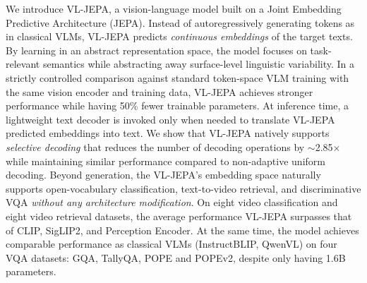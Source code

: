 
We introduce VL-JEPA, a vision-language model built on a Joint Embedding Predictive Architecture (JEPA). Instead of autoregressively generating tokens as in classical VLMs, VL-JEPA predicts \textit{continuous embeddings} of the target texts. By learning in an abstract representation space, the model focuses on task-relevant semantics while abstracting away surface-level linguistic variability. In a strictly controlled comparison against standard token-space VLM training with the same vision encoder and training data, VL-JEPA achieves stronger performance while having 50\% fewer trainable parameters. At inference time, a lightweight text decoder is invoked only when needed to translate VL-JEPA predicted embeddings into text. We show that VL-JEPA natively supports \textit{selective decoding} that reduces the number of decoding operations by $\sim$2.85$\times$ while maintaining similar performance compared to non-adaptive uniform decoding. Beyond generation, the VL-JEPA's embedding space naturally supports open-vocabulary classification, text-to-video retrieval, and discriminative VQA \textit{without any architecture modification}. On eight video classification and eight video retrieval datasets, the average performance VL-JEPA surpasses that of CLIP, SigLIP2, and Perception Encoder. At the same time, the model achieves comparable performance as classical VLMs (InstructBLIP, QwenVL) on four VQA datasets: GQA, TallyQA, POPE and POPEv2, despite only having 1.6B parameters.